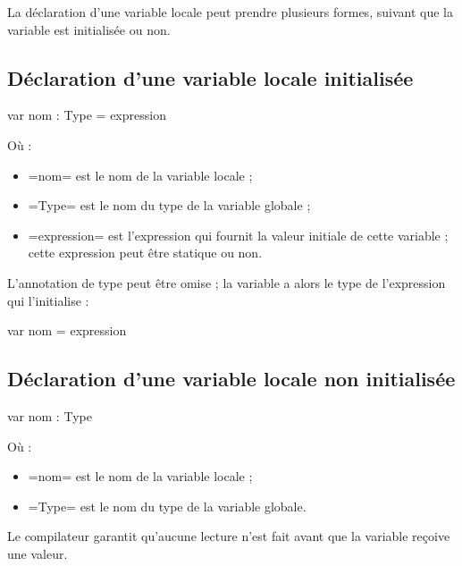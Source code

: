 
La déclaration d'une variable locale peut prendre plusieurs formes, suivant que la variable est initialisée ou non.

\subsection{Déclaration d'une variable locale initialisée}

\begin{PLM}
var nom : Type = expression
\end{PLM}

Où :
\begin{itemize}
  \item \plm=nom= est le nom de la variable locale ;
  \item \plm=Type= est le nom du type de la variable globale ;
  \item \plm=expression= est l'expression qui fournit la valeur initiale de cette variable ; cette expression peut être statique ou non.
\end{itemize}

L'annotation de type peut être omise ; la variable a alors le type de l'expression qui l'initialise :
\begin{PLM}
var nom = expression
\end{PLM}


\subsection{Déclaration d'une variable locale non initialisée}
\begin{PLM}
var nom : Type
\end{PLM}
Où :
\begin{itemize}
  \item \plm=nom= est le nom de la variable locale ;
  \item \plm=Type= est le nom du type de la variable globale.
\end{itemize}

Le compilateur garantit qu'aucune lecture n'est fait avant que la variable reçoive une valeur.
